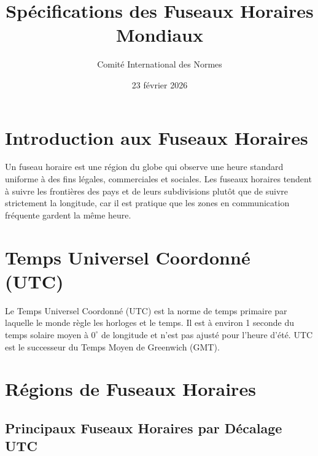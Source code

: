 \documentclass[12pt]{article}
\title{Spécifications des Fuseaux Horaires Mondiaux}
\author{Comité International des Normes}
\date{23 février 2026}
\begin{document}
\maketitle

\section{Introduction aux Fuseaux Horaires}

Un fuseau horaire est une région du globe qui observe une heure standard uniforme à des fins légales, commerciales et sociales. Les fuseaux horaires tendent à suivre les frontières des pays et de leurs subdivisions plutôt que de suivre strictement la longitude, car il est pratique que les zones en communication fréquente gardent la même heure.

\section{Temps Universel Coordonné (UTC)}

Le Temps Universel Coordonné (UTC) est la norme de temps primaire par laquelle le monde règle les horloges et le temps. Il est à environ 1 seconde du temps solaire moyen à $0^{\circ}$ de longitude et n'est pas ajusté pour l'heure d'été. UTC est le successeur du Temps Moyen de Greenwich (GMT).

\section{Régions de Fuseaux Horaires}

\subsection{Principaux Fuseaux Horaires par Décalage UTC}
\end{document}
